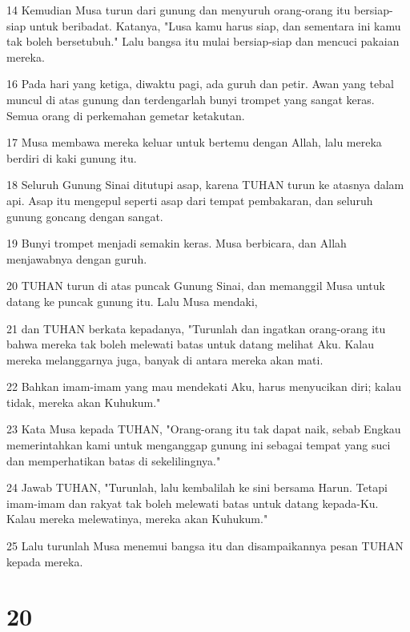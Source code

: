 \par 14 Kemudian Musa turun dari gunung dan menyuruh orang-orang itu bersiap-siap untuk beribadat. Katanya, "Lusa kamu harus siap, dan sementara ini kamu tak boleh bersetubuh." Lalu bangsa itu mulai bersiap-siap dan mencuci pakaian mereka.
\par 16 Pada hari yang ketiga, diwaktu pagi, ada guruh dan petir. Awan yang tebal muncul di atas gunung dan terdengarlah bunyi trompet yang sangat keras. Semua orang di perkemahan gemetar ketakutan.
\par 17 Musa membawa mereka keluar untuk bertemu dengan Allah, lalu mereka berdiri di kaki gunung itu.
\par 18 Seluruh Gunung Sinai ditutupi asap, karena TUHAN turun ke atasnya dalam api. Asap itu mengepul seperti asap dari tempat pembakaran, dan seluruh gunung goncang dengan sangat.
\par 19 Bunyi trompet menjadi semakin keras. Musa berbicara, dan Allah menjawabnya dengan guruh.
\par 20 TUHAN turun di atas puncak Gunung Sinai, dan memanggil Musa untuk datang ke puncak gunung itu. Lalu Musa mendaki,
\par 21 dan TUHAN berkata kepadanya, "Turunlah dan ingatkan orang-orang itu bahwa mereka tak boleh melewati batas untuk datang melihat Aku. Kalau mereka melanggarnya juga, banyak di antara mereka akan mati.
\par 22 Bahkan imam-imam yang mau mendekati Aku, harus menyucikan diri; kalau tidak, mereka akan Kuhukum."
\par 23 Kata Musa kepada TUHAN, "Orang-orang itu tak dapat naik, sebab Engkau memerintahkan kami untuk menganggap gunung ini sebagai tempat yang suci dan memperhatikan batas di sekelilingnya."
\par 24 Jawab TUHAN, "Turunlah, lalu kembalilah ke sini bersama Harun. Tetapi imam-imam dan rakyat tak boleh melewati batas untuk datang kepada-Ku. Kalau mereka melewatinya, mereka akan Kuhukum."
\par 25 Lalu turunlah Musa menemui bangsa itu dan disampaikannya pesan TUHAN kepada mereka.

\chapter{20}

